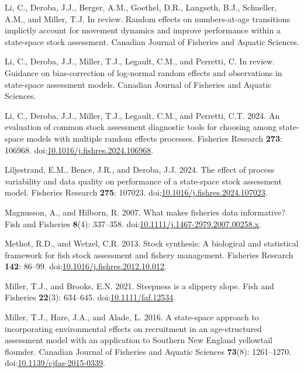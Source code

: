 \documentclass[
  12pt,
]{article}
\newlength{\cslhangindent}
\newlength{\cslentryspacingunit} %
\newenvironment{CSLReferences}[2] %
 {%
  \setlength{\parindent}{0pt}
  \ifodd #1
  \let\oldpar\par
  \def\par{\hangindent=\cslhangindent\oldpar}
  \fi
  \setlength{\parskip}{#2\cslentryspacingunit}
 }%
 {}
\begin{document}
\begin{CSLReferences}{1}{0}
\leavevmode{}%
Li, C., Deroba, J.J., Berger, A.M., Goethel, D.R., Langseth, B.J.,
Schueller, A.M., and Miller, T.J. In review. Random effects on
numbers-at-age transitions implictly account for movement dynamics and
improve performance within a state-space stock assessment. Canadian
Journal of Fisheries and Aquatic Sciences.

\leavevmode{}%
Li, C., Deroba, J.J., Miller, T.J., Legault, C.M., and Perretti, C. In
review. Guidance on bias-correction of log-normal random effects and
observations in state-space assessment models. Canadian Journal of
Fisheries and Aquatic Sciences.

\leavevmode{}%
Li, C., Deroba, J.J., Miller, T.J., Legault, C.M., and Perretti, C.T.
2024. An evaluation of common stock assessment diagnostic tools for
choosing among state-space models with multiple random effects
processes. Fisheries Research \textbf{273}: 106968.
doi:\href{https://doi.org/10.1016/j.fishres.2024.106968}{10.1016/j.fishres.2024.106968}.

\leavevmode{}%
Liljestrand, E.M., Bence, J.R., and Deroba, J.J. 2024. The effect of
process variability and data quality on performance of a state-space
stock assessment model. Fisheries Research \textbf{275}: 107023.
doi:\href{https://doi.org/10.1016/j.fishres.2024.107023}{10.1016/j.fishres.2024.107023}.

\leavevmode{}%
Magnusson, A., and Hilborn, R. 2007. What makes fisheries data
informative? Fish and Fisheries \textbf{8}(4): 337--358.
doi:\href{https://doi.org/10.1111/j.1467-2979.2007.00258.x}{10.1111/j.1467-2979.2007.00258.x}.

\leavevmode{}%
Methot, R.D., and Wetzel, C.R. 2013. Stock synthesis: A biological and
statistical framework for fish stock assessment and fishery management.
Fisheries Research \textbf{142}: 86--99.
doi:\href{https://doi.org/10.1016/j.fishres.2012.10.012}{10.1016/j.fishres.2012.10.012}.

\leavevmode{}%
Miller, T.J., and Brooks, E.N. 2021. Steepness is a slippery slope. Fish
and Fisheries \textbf{22}(3): 634--645.
doi:\href{https://doi.org/10.1111/faf.12534}{10.1111/faf.12534}.

\leavevmode{}%
Miller, T.J., Hare, J.A., and Alade, L. 2016. A state-space approach to
incorporating environmental effects on recruitment in an age-structured
assessment model with an application to {S}outhern {N}ew {E}ngland
yellowtail flounder. Canadian Journal of Fisheries and Aquatic Sciences
\textbf{73}(8): 1261--1270.
doi:\href{https://doi.org/10.1139/cjfas-2015-0339}{10.1139/cjfas-2015-0339}.


\end{CSLReferences}
\end{document}
